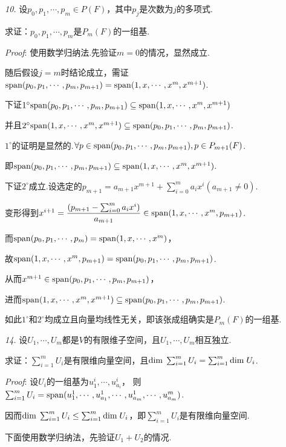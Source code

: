 \textit{10.}
设\(p_0,p_1,\cdots,p_m\in P(F)\)，其中\(p_j\)是次数为\(j\)的多项式.

求证：\(p_0,p_1,\cdots,p_m\)是\(P_m(F)\)的一组基.

\textit{Proof}:
使用数学归纳法.先验证\(m=0\)的情况，显然成立.

随后假设\(j=m\)时结论成立，需证\(\mathrm{span} (p_0,p_1,\cdots,p_m,p_{m+1})=\mathrm{span} (1,x,\cdots,x^m,x^{m+1})\).

下证\(1^{\circ}\mathrm{span} (p_0,p_1,\cdots,p_m,p_{m+1}) \subseteq \mathrm{span} (1,x,\cdots,x^m,x^{m+1})\)

并且\(2^{\circ}\mathrm{span} (1,x,\cdots,x^m,x^{m+1}) \subseteq \mathrm{span} (p_0,p_1,\cdots,p_m,p_{m+1})\).

\(1^{\circ}\)的证明是显然的.\(\forall p\in \mathrm{span} (p_0,p_1,\cdots,p_m,p_{m+1}),p\in P_{m+1}(F)\).

即\(\mathrm{span} (p_0,p_1,\cdots,p_m,p_{m+1})\subseteq \mathrm{span} (1,x,\cdots,x^m,x^{m+1})\).

下证\(2^{\circ}\)成立.设选定的\(p_{m+1}=a_{m+1}x^{m+1}+\sum_{i=0}^m a_ix^i(a_{m+1} \ne 0)\).

变形得到\(x^{i+1}=\dfrac{(p_{m+1}-\sum_{i=0}^m a_ix^i)}{a_{m+1}} \in \mathrm{span} (1,x,\cdots,x^m,p_{m+1})\).

而\(\mathrm{span} (p_0,p_1,\cdots,p_m)=\mathrm{span} (1,x,\cdots,x^m)\)，

故\(\mathrm{span} (1,x,\cdots,x^m,p_{m+1})=\mathrm{span} (p_0,p_1,\cdots,p_m,p_{m+1})\).

从而\(x^{m+1}\in \mathrm{span} (p_0,p_1,\cdots,p_m,p_{m+1})\)，

进而\(\mathrm{span} (1,x,\cdots,x^m,x^{m+1}) \subseteq \mathrm{span} (p_0,p_1,\cdots,p_m,p_{m+1})\).

如此\(1^{\circ}\)和\(2^{\circ}\)均成立且向量均线性无关，即该张成组确实是\(P_m(F)\)的一组基.

\hspace*{\fill}

\textit{14.}
设\(U_1,\cdots,U_m\)都是\(V\)的有限维子空间，且\(U_1,\cdots,U_m\)相互独立.

求证：\(\sum_{i=1}^m U_i\)是有限维向量空间，且\(\mathrm{dim \;} \sum_{i=1}^m U_i=\sum_{i=1}^m \mathrm{dim \;} U_i\).

\textit{Proof}:
设\(U_i\)的一组基为\(u_1^i,\cdots,u_{a_i}^i\)，
则\(\sum_{i=1}^m U_i=\mathrm{span}(u_1^1,\cdots,u_{a_1}^1,\cdots,u_{a_m}^1,\cdots,u_{a_m}^m)\).

因而\(\mathrm{dim \;} \sum_{i=1}^m U_i \leq \sum_{i=1}^m \mathrm{dim \;} U_i\)，即\(\sum_{i=1}^m U_i\)是有限维向量空间.

下面使用数学归纳法，先验证\(U_1+U_2\)的情况.


